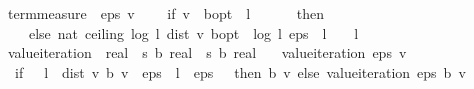 \begin{isabellebody}
\isamarkupfalse%
%
\endisatagproof
{\isafoldproof}%
%
\isadelimproof
\isanewline
%
\endisadelimproof
\isanewline
{}\isamarkupfalse%
\ {\isachardoublequoteopen}term{\isacharunderscore}{\kern0pt}measure\ {\isasymequiv}\ {\isacharparenleft}{\kern0pt}{\isasymlambda}{\isacharparenleft}{\kern0pt}eps{\isacharcomma}{\kern0pt}\ v{\isacharparenright}{\kern0pt}{\isachardot}{\kern0pt}\isanewline
\ \ \ \ if\ v\ {\isacharequal}{\kern0pt}\ {\isasymnu}\isactrlsub b{\isacharunderscore}{\kern0pt}opt\ {\isasymor}\ l\ {\isacharequal}{\kern0pt}\ {}\isanewline
\ \ \ \ then\ {}\isanewline
\ \ \ \ else\ nat\ {\isacharparenleft}{\kern0pt}ceiling\ {\isacharparenleft}{\kern0pt}log\ {\isacharparenleft}{\kern0pt}{}{\isacharslash}{\kern0pt}l{\isacharparenright}{\kern0pt}\ {\isacharparenleft}{\kern0pt}dist\ v\ {\isasymnu}\isactrlsub b{\isacharunderscore}{\kern0pt}opt{\isacharparenright}{\kern0pt}\ {\isacharminus}{\kern0pt}\ log\ {\isacharparenleft}{\kern0pt}{}{\isacharslash}{\kern0pt}l{\isacharparenright}{\kern0pt}\ {\isacharparenleft}{\kern0pt}eps\ {\isacharasterisk}{\kern0pt}\ {\isacharparenleft}{\kern0pt}{}{\isacharminus}{\kern0pt}l{\isacharparenright}{\kern0pt}\ {\isacharslash}{\kern0pt}\ {\isacharparenleft}{\kern0pt}{}\ {\isacharasterisk}{\kern0pt}\ l{\isacharparenright}{\kern0pt}{\isacharparenright}{\kern0pt}{\isacharparenright}{\kern0pt}{\isacharparenright}{\kern0pt}{\isacharparenright}{\kern0pt}{\isachardoublequoteclose}\isanewline
\isanewline
{}\isamarkupfalse%
\ value{\isacharunderscore}{\kern0pt}iteration\ {\isacharcolon}{\kern0pt}{\isacharcolon}{\kern0pt}\ {\isachardoublequoteopen}real\ {\isasymRightarrow}\ {\isacharparenleft}{\kern0pt}{\isacharprime}{\kern0pt}s\ {\isasymRightarrow}\isactrlsub b\ real{\isacharparenright}{\kern0pt}\ {\isasymRightarrow}\ {\isacharparenleft}{\kern0pt}{\isacharprime}{\kern0pt}s\ {\isasymRightarrow}\isactrlsub b\ real{\isacharparenright}{\kern0pt}{\isachardoublequoteclose}\ \isanewline
\ \ {\isachardoublequoteopen}value{\isacharunderscore}{\kern0pt}iteration\ eps\ v\ {\isacharequal}{\kern0pt}\isanewline
\ \ {\isacharparenleft}{\kern0pt}if\ {}\ {\isacharasterisk}{\kern0pt}\ l\ {\isacharasterisk}{\kern0pt}\ dist\ v\ {\isacharparenleft}{\kern0pt}{\isasymL}\isactrlsub b\ v{\isacharparenright}{\kern0pt}\ {\isacharless}{\kern0pt}\ eps\ {\isacharasterisk}{\kern0pt}\ {\isacharparenleft}{\kern0pt}{}{\isacharminus}{\kern0pt}l{\isacharparenright}{\kern0pt}\ {\isasymor}\ eps\ {\isasymle}\ {}\ then\ {\isasymL}\isactrlsub b\ v\ else\ value{\isacharunderscore}{\kern0pt}iteration\ eps\ {\isacharparenleft}{\kern0pt}{\isasymL}\isactrlsub b\ v{\isacharparenright}{\kern0pt}{\isacharparenright}{\kern0pt}{\isachardoublequoteclose}\isanewline

\end{isabellebody}
